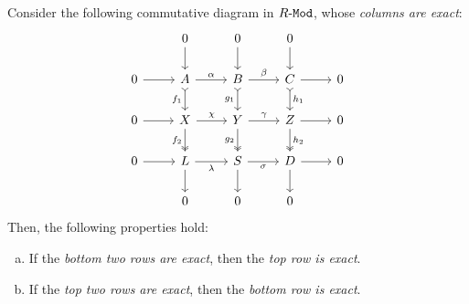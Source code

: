 \begin{proposition}
    \label{prop:3-by-3-lemma}
    Consider the following commutative diagram in \({R\text{-}\texttt{Mod}}\), whose \emph{columns
        are exact}:
    \[
        \begin{tikzcd}
            &0 \ar[d] &0 \ar[d] &0 \ar[d] &
            \\
            0 \ar[r]
            &A \ar[r, "\alpha"] \ar[d, tail, "f_1"']
            &B \ar[r, "\beta"] \ar[d, tail, "g_1"']
            &C \ar[r] \ar[d, tail, "h_1"]
            &0
            \\
            0 \ar[r]
            &X \ar[r, "\chi"] \ar[d, two heads, "f_2"']
            &Y \ar[r, "\gamma"] \ar[d, two heads, "g_2"']
            &Z \ar[r] \ar[d, two heads, "h_2"]
            &0
            \\
            0 \ar[r]
            &L \ar[r, "\lambda"'] \ar[d]
            &S \ar[r, "\sigma"'] \ar[d]
            &D \ar[r] \ar[d]
            &0
            \\
            &0 &0 &0 &
        \end{tikzcd}
    \]
    Then, the following properties hold:
    \begin{enumerate}[(a)]\setlength\itemsep{0em}
        \item If the \emph{bottom two rows are exact}, then the \emph{top row is exact}.
        \item If the \emph{top two rows are exact}, then the \emph{bottom row is exact}.
    \end{enumerate}
\end{proposition}

